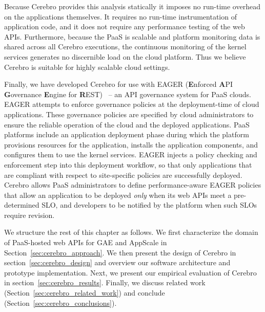 Because Cerebro provides this 
analysis statically it imposes no run-time overhead on the applications
themselves. It requires no run-time instrumentation of application code,
and it does not require any performance testing of the web APIs.
Furthermore, because the PaaS is scalable and platform monitoring data is 
shared across all Cerebro executions, the continuous monitoring of the
kernel services generates no discernible load on the cloud platform.
Thus we believe Cerebro is suitable for highly scalable cloud
settings.

Finally, we have developed Cerebro for use with EAGER (\textbf{E}nforced
\textbf{A}PI \textbf{G}overnance \textbf{E}ngine for
\textbf{R}EST)~\cite{eager-fop15} --
an API governance system for PaaS clouds. EAGER attempts to enforce
governance policies at the deployment-time of cloud applications. These governance
policies are specified by cloud administrators to ensure the reliable
operation of the cloud and the deployed applications. PaaS
platforms include an application deployment phase during which the platform provisions
resources for the application, installs the application components, and
configures them to use the kernel services. EAGER injects a policy checking and
enforcement step into this deployment workflow, so that only applications that
are compliant with respect to site-specific policies are successfully deployed. 
Cerebro allows PaaS administrators to define
performance-aware EAGER policies that allow an application to be deployed \textit{only} when its
web APIs meet a pre-determined SLO, and developers to be
notified by the platform when such SLOs require revision.

We structure the rest of this chapter as follows.
We first characterize the domain of 
PaaS-hosted web APIs for GAE and AppScale 
in Section~\ref{sec:cerebro_approach}.   
We then present the design of Cerebro in section~\ref{sec:cerebro_design}
and overview our software architecture and prototype implementation.
Next, we
present our empirical evaluation of Cerebro in 
section~\ref{sec:cerebro_results}.
Finally,  we discuss related work (Section~\ref{sec:cerebro_related_work}) and 
conclude (Section~\ref{sec:cerebro_conclusions}).